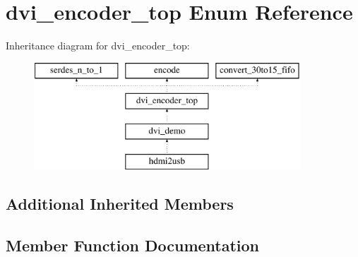 \section{dvi\-\_\-encoder\-\_\-top Enum Reference}
\label{enum1dvi__encoder__top}
Inheritance diagram for dvi\-\_\-encoder\-\_\-top\-:\begin{figure}[H]
\begin{center}
\leavevmode
\includegraphics[height=4.000000cm]{enum1dvi__encoder__top}
\end{center}
\end{figure}
\subsection*{Additional Inherited Members}


\subsection{Member Function Documentation}
\subsubsection[{P\-R\-O\-C\-E\-S\-S\-\_\-35}]{\setlength{\rightskip}{0pt plus 5cm}\hspace{0.3cm}}\label{enum1dvi__encoder__top_ac2ed0cf58652536f29e7ce7aeb02c772}
\subsubsection[{P\-R\-O\-C\-E\-S\-S\-\_\-36}]{\setlength{\rightskip}{0pt plus 5cm}\hspace{0.3cm}}\label{enum1dvi__encoder__top_aa2e968f09b7552ac5a4c99439be86357}


